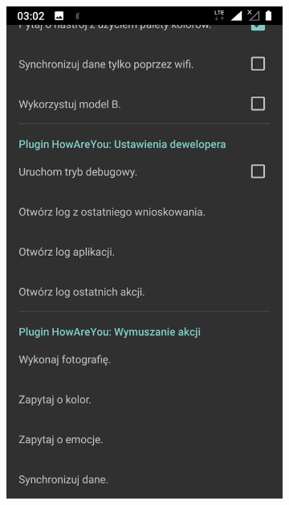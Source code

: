 \begin{figure}[H]
\centering
\begin{subfigure}{0.35\textwidth}
	\centering
	\includegraphics[scale=0.13]{rozdzial3/Ustawienia_cz2.png}
	\subcaption{\label{subfigure_a}}
\end{subfigure}
\begin{subfigure}{0.35\textwidth}
	\centering

\end{subfigure}
\end{figure}
